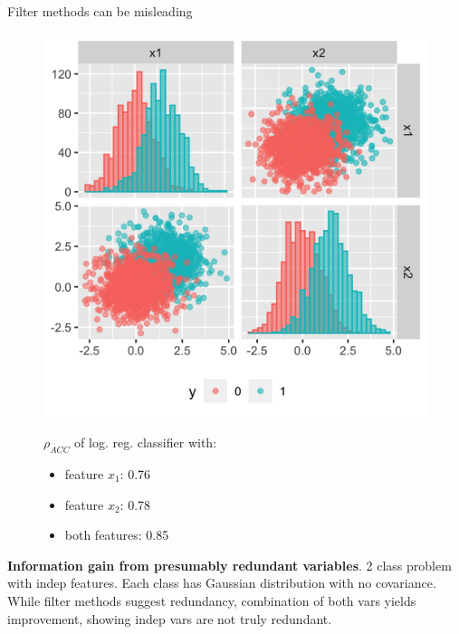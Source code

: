 \documentclass[11pt,compress,t,notes=noshow, xcolor=table]{beamer}
\begin{document}
  \begin{vbframe}{Filter methods can be misleading}

   \begin{figure}
    \centering
    \begin{minipage}{0.45\textwidth}
        \centering
        \includegraphics[width=\textwidth]{figure/guyon_example_presumably_redundant.png} %
    \end{minipage}\hfill
    \begin{minipage}{0.45\textwidth}
        $\rho_{ACC}$ of log. reg. classifier with:
        \begin{itemize}
        \item{feature $x_1$: 0.76}
        \item{feature $x_2$: 0.78}
        \item{both features: 0.85}
        \end{itemize}
    \end{minipage}
    \end{figure}
\vspace{0.3cm}
\footnotesize{\textbf{Information gain from presumably redundant variables}. 2 class problem with indep features. Each class has Gaussian distribution with no covariance. While filter methods suggest redundancy, combination of both vars yields improvement, showing indep vars are not truly redundant. %
}
\end{vbframe}
\end{document}
